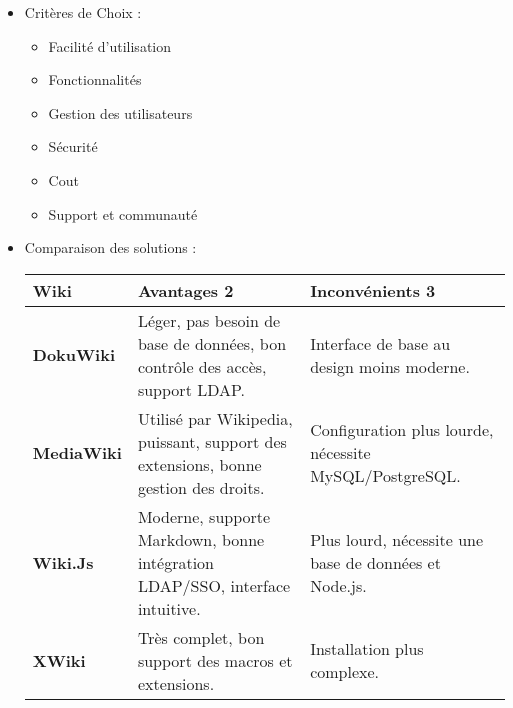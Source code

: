 \documentclass[../Livrable1.tex]{subfiles}
\begin{document}
	

\begin{itemize}
    \item Critères de Choix :
    \begin{multicols}{2}
    \begin{itemize}
    	\item Facilité d'utilisation
    	\item Fonctionnalités
    	\item Gestion des utilisateurs
    	\item Sécurité
    	\item Cout
    	\item Support et communauté
    \end{itemize}
	\end{multicols}

    \item Comparaison des solutions :
    	
    	\renewcommand{\arraystretch}{1.5}
    	\begin{tabularx}{\textwidth}{|X|X|X|}
    		\hline
    		Wiki & Avantages 2 & Inconvénients 3 \\ 
    		\hline
    		\textbf{DokuWiki} & Léger, pas besoin de base de données,  bon contrôle des accès, support LDAP. & Interface de base au design moins moderne. \\
    		\hline
    		\textbf{MediaWiki} & Utilisé par Wikipedia, puissant, support des extensions, bonne gestion des droits. & Configuration plus lourde, nécessite MySQL/PostgreSQL. \\
    		\hline
    		\textbf{Wiki.Js} & Moderne, supporte Markdown, bonne intégration LDAP/SSO, interface intuitive. & Plus lourd, nécessite une base de données et Node.js. \\
    		\hline
    		\textbf{XWiki} & Très complet, bon support des macros et extensions. & Installation plus complexe. \\
    		\hline
    \end{tabularx}
    
\end{itemize}



\end{document}
